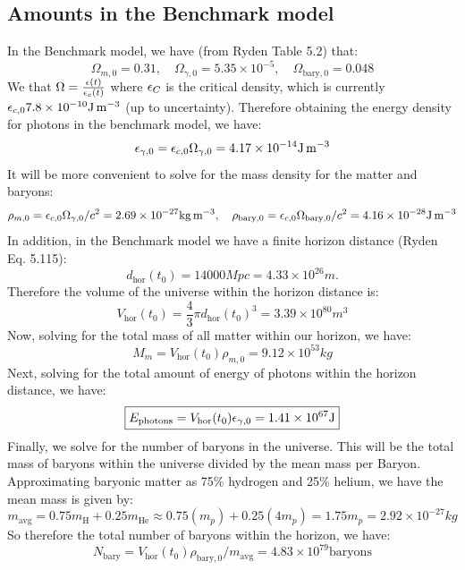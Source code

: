 \subsection{Amounts in the Benchmark model}
In the Benchmark model, we have (from Ryden Table 5.2) that:
\begin{equation}
    \Omega_{m, 0} = 0.31, \quad \Omega_{\gamma, 0} = 5.35 \times 10^{-5},\quad  \Omega_{\text{bary}, 0} = 0.048
\end{equation}
We that $\Omega = \frac{\e(t)}{\e_c(t)}$ where $\e_C$ is the critical density, which is currently $\e_{c, 0} 7.8 \times 10^{-10}\si{J.m^{-3}}$ (up to uncertainty). Therefore obtaining the energy density for photons in the benchmark model, we have:
\begin{equation}
    \e_{\gamma, 0} = \e_{c, 0}\Omega_{\gamma, 0} = 4.17 \times 10^{-14} \si{J.m^{-3}}
\end{equation}
It will be more convenient to solve for the mass density for the matter and baryons:
\begin{equation}
    \rho_{m, 0} = \e_{c, 0}\Omega_{\gamma, 0}/c^2 = 2.69 \times 10^{-27}\si{kg.m^{-3}}, \quad \rho_{\text{bary}, 0} = \e_{c, 0}\Omega_{\text{bary}, 0}/c^2 = 4.16 \times 10^{-28} \si{J.m^{-3}} 
\end{equation}
In addition, in the Benchmark model we have a finite horizon distance (Ryden Eq. 5.115):
\begin{equation}
    d_{\text{hor}}(t_0) = 14000\si{Mpc} = 4.33 \times 10^{26}\si{m}.
\end{equation}
Therefore the volume of the universe within the horizon distance is:
\begin{equation}
    V_{\text{hor}}(t_0) = \frac{4}{3}\pi d_{\text{hor}}(t_0)^3 = 3.39 \times 10^{80} \si{m^3}
\end{equation}
Now, solving for the total mass of all matter within our horizon, we have:
\begin{equation}
    \boxed{M_m =  V_{\text{hor}}(t_0)\rho_{m, 0} = 9.12 \times 10^{53}\si{kg}}
\end{equation}
Next, solving for the total amount of energy of photons within the horizon distance, we have:
\begin{equation}
    \boxed{E_{\text{photons}} = V_{\text{hor}}(t_0)\e_{\gamma, 0} = 1.41 \times 10^{67} \si{J}}
\end{equation}
Finally, we solve for the number of baryons in the universe. This will be the total mass of baryons within the universe divided by the mean mass per Baryon. Approximating baryonic matter as 75\% hydrogen and 25\% helium, we have the mean mass is given by:
\begin{equation}
    m_{\text{avg}} = 0.75m_{\text{H}} + 0.25m_{\text{He}} \approx 0.75(m_p) + 0.25(4m_p) = 1.75m_{p} = 2.92 \times 10^{-27}\si{kg}
\end{equation}
So therefore the total number of baryons within the horizon, we have:
\begin{equation}
    \boxed{N_{\text{bary}} =  V_{\text{hor}}(t_0)\rho_{\text{bary}, 0}/m_{\text{avg}} = 4.83 \times 10^{79} \text{baryons}}
\end{equation}

